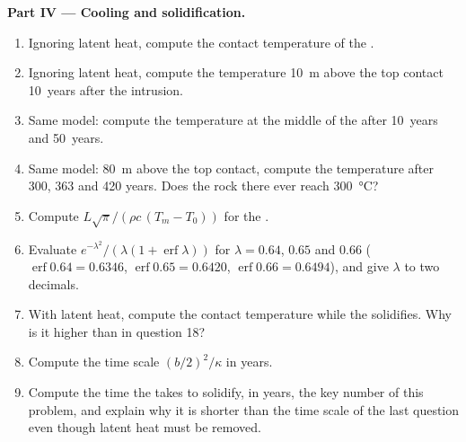 \begin{problem}
\noindent\textbf{Part IV --- Cooling and solidification.}
\begin{enumerate}[resume]
\item Ignoring latent heat, compute the contact temperature of the .
\item Ignoring latent heat, compute the temperature \qty{10}{m} above the top
contact \num{10}~years after the intrusion.
\item Same model: compute the temperature at the middle of the  after
\num{10}~years and \num{50}~years.
\item Same model: \qty{80}{m} above the top contact, compute the temperature after
\num{300}, \num{363} and \num{420} years. Does the rock there ever reach
\qty{300}{\celsius}?
\item Compute $L\sqrt\pi/(\rho c\,(T_m - T_0))$ for the .
\item Evaluate $e^{-\lambda^2}/(\lambda(1 + \operatorname{erf}\lambda))$ for $\lambda = 0.64$,
$0.65$ and $0.66$ ($\operatorname{erf}0.64 = 0.6346$, $\operatorname{erf}0.65 = 0.6420$,
$\operatorname{erf}0.66 = 0.6494$), and give $\lambda$ to two decimals.
\item With latent heat, compute the contact temperature while the 
solidifies. Why is it higher than in question 18?
\item Compute the time scale $(b/2)^2/\kappa$ in years.
\item Compute the time the  takes to solidify, in years, the key number of
this problem, and explain why it is shorter than the time scale of the last
question even though latent heat must be removed.
\end{enumerate}
\end{problem}
